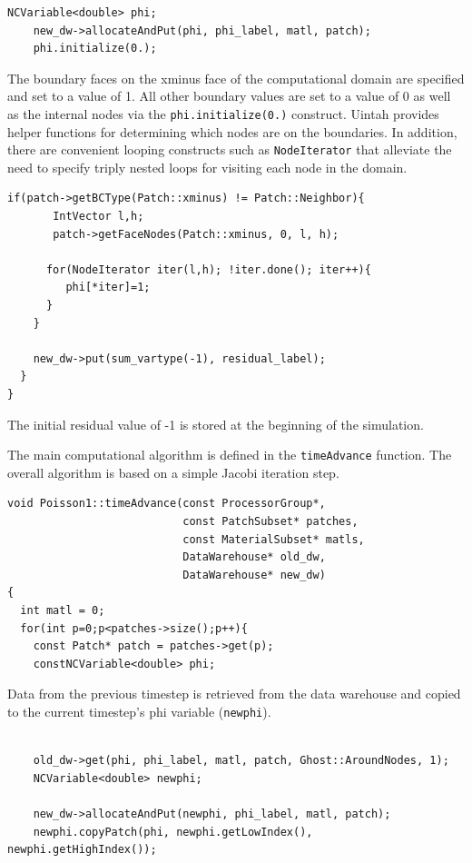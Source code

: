 \documentclass[12pt]{report}
\begin{document}
\begin{Verbatim}[fontsize=\footnotesize]
    NCVariable<double> phi;
    new_dw->allocateAndPut(phi, phi_label, matl, patch);
    phi.initialize(0.);
\end{Verbatim}

The boundary faces on the xminus face of the computational domain are
specified and set to a value of 1.  All other boundary values are set
to a value of 0 as well as the internal nodes via the
\texttt{phi.initialize(0.)} construct.  Uintah provides helper
functions for determining which nodes are on the boundaries.  In
addition, there are convenient looping constructs such as
\texttt{NodeIterator} that alleviate the need to specify triply nested
loops for visiting each node in the domain.

\begin{Verbatim}[fontsize=\footnotesize]
    if(patch->getBCType(Patch::xminus) != Patch::Neighbor){
       IntVector l,h;
       patch->getFaceNodes(Patch::xminus, 0, l, h);

      for(NodeIterator iter(l,h); !iter.done(); iter++){
         phi[*iter]=1;
      }
    }

    new_dw->put(sum_vartype(-1), residual_label);
  }
}

\end{Verbatim}

The initial residual value of -1 is stored at the beginning of the
simulation.

The main computational algorithm is defined in the
\texttt{timeAdvance} function.  The overall algorithm is based on a
simple Jacobi iteration step.

\begin{Verbatim}[fontsize=\footnotesize]
void Poisson1::timeAdvance(const ProcessorGroup*,
                           const PatchSubset* patches,
                           const MaterialSubset* matls,
                           DataWarehouse* old_dw,
                           DataWarehouse* new_dw)
{
  int matl = 0;
  for(int p=0;p<patches->size();p++){
    const Patch* patch = patches->get(p);
    constNCVariable<double> phi;

\end{Verbatim}

Data from the previous timestep is retrieved from the data warehouse
and copied to the current timestep's phi variable (\texttt{newphi}).

\begin{Verbatim}[fontsize=\footnotesize]

    old_dw->get(phi, phi_label, matl, patch, Ghost::AroundNodes, 1);
    NCVariable<double> newphi;

    new_dw->allocateAndPut(newphi, phi_label, matl, patch);
    newphi.copyPatch(phi, newphi.getLowIndex(), newphi.getHighIndex());

\end{Verbatim}
\end{document}
